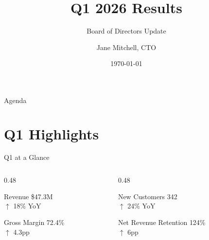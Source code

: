 \documentclass[aspectratio=169,11pt]{beamer}
\title{Q1 2026 Results}
\subtitle{Board of Directors Update}
\author{Jane Mitchell, CTO}
\institute{Acme Corp}
\date{\today}
\begin{document}
\begin{frame}
    \titlepage
\end{frame}

\begin{frame}{Agenda}
    \tableofcontents
\end{frame}

\section{Q1 Highlights}

\begin{frame}{Q1 at a Glance}
    \begin{columns}[T]
        \begin{column}{0.48\textwidth}
            \begin{block}{Revenue}
                \centering
                {\Huge \$47.3M}\\[4pt]
                {\color{success} $\uparrow$ 18\% YoY}
            \end{block}
            \vspace{8pt}
            \begin{block}{Gross Margin}
                \centering
                {\Huge 72.4\%}\\[4pt]
                {\color{success} $\uparrow$ 4.3pp}
            \end{block}
        \end{column}
        \begin{column}{0.48\textwidth}
            \begin{block}{New Customers}
                \centering
                {\Huge 342}\\[4pt]
                {\color{success} $\uparrow$ 24\% YoY}
            \end{block}
            \vspace{8pt}
            \begin{block}{Net Revenue Retention}
                \centering
                {\Huge 124\%}\\[4pt]
                {\color{success} $\uparrow$ 6pp}
            \end{block}
        \end{column}
    \end{columns}
\end{frame}
\end{document}
